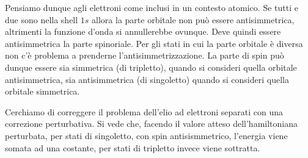 \documentclass[../AppuntiStruttura]{subfiles}
\begin{document}
		Pensiamo dunque agli elettroni come inclusi in un contesto atomico. Se tutti e due sono nella shell $ 1s $ allora la parte orbitale non può essere antisimmetrica, altrimenti la funzione d'onda si annullerebbe ovunque. Deve quindi essere antisimmetrica la parte spinoriale. Per gli stati in cui la parte orbitale è diversa non c'è problema a prenderne l'antisimmetrizzazione. La parte di spin può dunque essere sia simmetrica (di tripletto), quando si consideri quella orbitale antisimmetrica, sia antisimmetrica (di singoletto) quando si consideri quella orbitale simmetrica.
		
		Cerchiamo di correggere il problema dell'elio ad elettroni separati con una correzione perturbativa. Si vede che, facendo il valore atteso dell'hamiltoniana perturbata, per stati di singoletto, con spin antisismmetrico, l'energia viene somata ad una costante, per stati di tripletto invece viene sottratta. 
\end{document}
